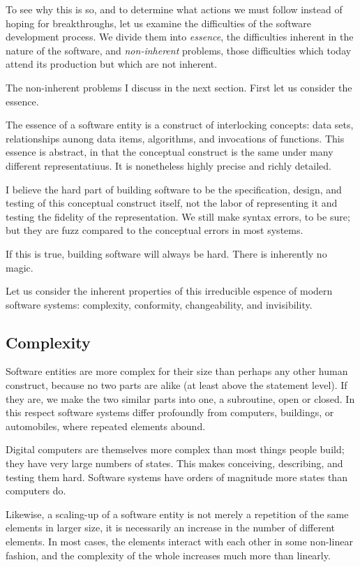 \documentclass[12pt,final]{article}
\begin{document}
To see why this is so, and to determine what actions we must follow instead of
hoping for breakthroughs, let us examine the difficulties of the software
development process. We divide them into \emph{essence}, the difficulties
inherent in the nature of the software, and \emph{non-inherent} problems, those
difficulties which today attend its production but which are not inherent.

The non-inherent problems I discuss in the next section. First let us consider
the essence.

The essence of a software entity is a construct of interlocking concepts: data
sets, relationships aunong data items, algorithms, and invocations of
functions. This essence is abstract, in that the conceptual construct is the
same under many different representatiuus.  It is nonetheless highly precise
and richly detailed.

I believe the hard part of building software to be the specification, design,
and testing of this conceptual construct itself, not the labor of representing
it and testing the fidelity of the representation. We still make syntax errors,
to be sure; but they are fuzz compared to the conceptual errors in most
systems.

If this is true, building software will always be hard. There is inherently no
magic.

Let us consider the inherent properties of this irreducible espence of modern
software systems: complexity, conformity, changeability, and invisibility.

\subsection*{Complexity}

Software entities are more complex for their size than perhaps any other human
construct, because no two parts are alike (at least above the statement level).
If they are, we make the two similar parts into one, a subroutine, open or
closed. In this respect software systems differ profoundly from computers,
buildings, or automobiles, where repeated elements abound.

Digital computers are themselves more complex than most things people build;
they have very large numbers of states. This makes conceiving, describing, and
testing them hard. Software systems have orders of magnitude more states than
computers do.

Likewise, a scaling-up of a software entity is not merely a repetition of the
same elements in larger size, it is necessarily an increase in the number of
different elements.  In most cases, the elements interact with each other in
some non-linear fashion, and the complexity of the whole increases much more
than linearly.
\end{document}
